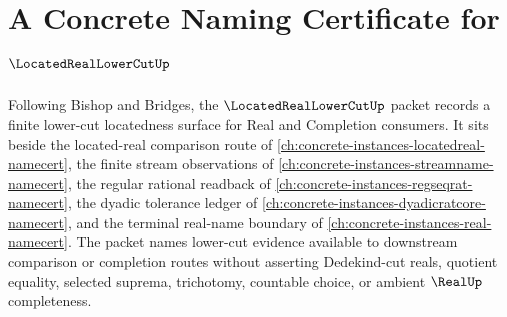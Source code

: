\chapter{A Concrete Naming Certificate for $\LocatedRealLowerCutUp$}
\label{ch:concrete-instances-located-real-lower-cut-namecert}

Following Bishop and Bridges, the $\LocatedRealLowerCutUp$ packet records a finite lower-cut locatedness surface for Real and Completion consumers. It sits beside the located-real comparison route of \autoref{ch:concrete-instances-locatedreal-namecert}, the finite stream observations of \autoref{ch:concrete-instances-streamname-namecert}, the regular rational readback of \autoref{ch:concrete-instances-regseqrat-namecert}, the dyadic tolerance ledger of \autoref{ch:concrete-instances-dyadicratcore-namecert}, and the terminal real-name boundary of \autoref{ch:concrete-instances-real-namecert}. The packet names lower-cut evidence available to downstream comparison or completion routes without asserting Dedekind-cut reals, quotient equality, selected suprema, trichotomy, countable choice, or ambient $\RealUp$ completeness.

